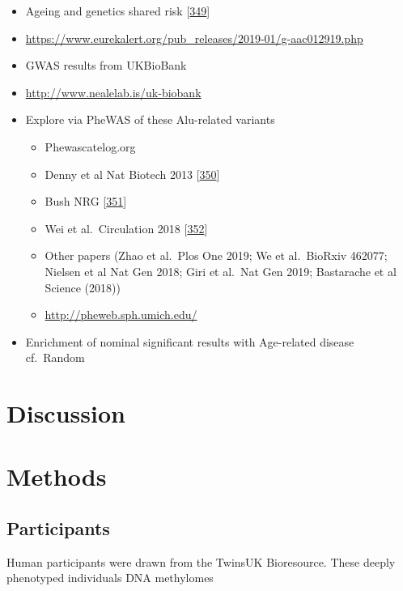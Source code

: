 \documentclass[
]{book}
\providecommand{\tightlist}{%
  \setlength{\itemsep}{0pt}\setlength{\parskip}{0pt}}
\begin{document}
\begin{itemize}
\tightlist
\item
  Ageing and genetics shared risk {[}\protect\hyperlink{ref-Zenin2019}{349}{]}
\item
  \url{https://www.eurekalert.org/pub_releases/2019-01/g-aac012919.php}
\item
  GWAS results from UKBioBank
\item
  \url{http://www.nealelab.is/uk-biobank}
\item
  Explore via PheWAS of these Alu-related variants

  \begin{itemize}
  \tightlist
  \item
    Phewascatelog.org
  \item
    Denny et al Nat Biotech 2013 {[}\protect\hyperlink{ref-Denny2014}{350}{]}
  \item
    Bush NRG {[}\protect\hyperlink{ref-Bush2016}{351}{]}
  \item
    Wei et al.~Circulation 2018 {[}\protect\hyperlink{ref-Wei2018}{352}{]}
  \item
    Other papers (Zhao et al.~Plos One 2019; We et al.~BioRxiv 462077; Nielsen et al Nat Gen 2018; Giri et al.~Nat Gen 2019; Bastarache et al Science (2018))
  \item
    \url{http://pheweb.sph.umich.edu/}
  \end{itemize}
\item
  Enrichment of nominal significant results with Age-related disease cf.~Random
\end{itemize}

\newpage

\hypertarget{discussion-2}{%
\section{Discussion}\label{discussion-2}}

\newpage

\hypertarget{methods-3}{%
\section{Methods}\label{methods-3}}

\hypertarget{participants-2}{%
\subsection{Participants}\label{participants-2}}

Human participants were drawn from the TwinsUK Bioresource.
These deeply phenotyped individuals DNA methylomes
\end{document}
